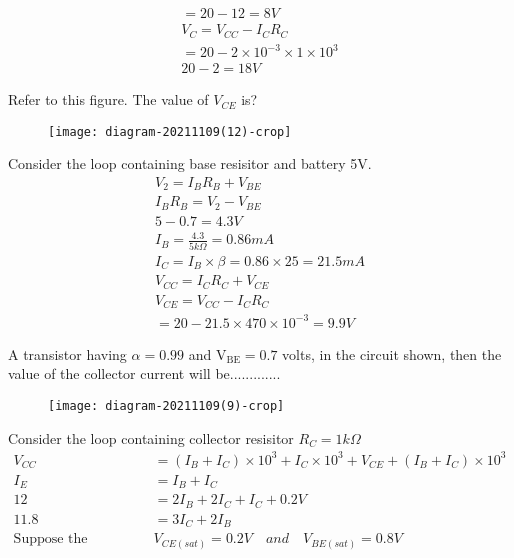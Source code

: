 \begin{enumerate}
\begin{answer}
\begin{align*}
=20-12=8V\\
V_C=V_{CC}-I_CR_C\\
=20-2\times 10^{-3}\times 1 \times 10^3\\
20-2=18V
\end{align*}	
\end{answer}
	\begin{minipage}{\textwidth}
	\item Refer to this figure. The value of $V_{C E}$   is?
	\begin{figure}[H]
		\centering
		\texttt{[image: diagram-20211109(12)-crop]}
	\end{figure}
\end{minipage}
\begin{answer}
	Consider the loop containing base resisitor and battery 5V.
	\begin{align*}
	V_2=I_BR_B+V_{BE}\\
	I_BR_B=V_2-V_{BE}\\
	5-0.7=4.3V\\
	I_B=\frac{4.3}{5k\Omega}=0.86mA\\
	I_C=I_B\times \beta=0.86\times 25=21.5mA\\
	V_{CC}=I_CR_C+V_{CE}\\
	V_{CE}=V_{CC}-I_CR_C\\
	=20-21.5\times 470 \times 10^{-3}=9.9V
	\end{align*}
\end{answer}
	\begin{minipage}{\textwidth}
	\item A transistor having $\alpha=0.99$ and $\mathrm{V}_{\mathrm{BE}}=0.7$ volts, in the circuit shown, then the value of the collector current will be.............
	\begin{figure}[H]
		\centering
		\texttt{[image: diagram-20211109(9)-crop]}
	\end{figure}
\end{minipage}
\begin{answer}
	Consider the loop containing collector resisitor $R_C=1k\Omega$
\begin{align*}
V_{CC}&=(I_B+I_C)\times 10^3+I_C\times 10^3+V_{CE}+(I_B+I_C)\times 10^3\\
I_E&=I_B+I_C\\
12&=2I_B+2I_C+I_C+0.2V\\
11.8&=3I_C+2I_B\\
\text{Suppose the transistor is at saturation then }& V_{CE(sat)}=0.2V \quad and \quad V_{BE(sat)}=0.8V\\

\end{align*}
\end{answer}
\end{enumerate}
